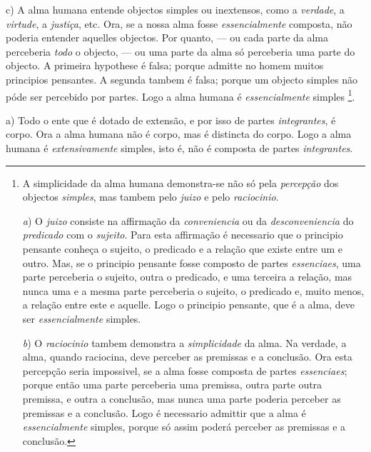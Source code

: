 c) A alma humana entende objectos simples ou inextensos, como a \emph{verdade}, a \emph{virtude}, a \emph{justiça}, etc. Ora, se a nossa alma fosse \emph{essencialmente} composta, não poderia entender aquelles objectos. Por quanto, --- ou cada parte da alma perceberia \emph{todo} o objecto, --- ou uma parte da alma só perceberia uma parte do objecto. A primeira hypothese é falsa; porque admitte no homem muitos principios pensantes. A segunda tambem é falsa; porque um objecto simples não póde ser percebido por partes. Logo a alma humana é \emph{essencialmente} simples \footnote{A simplicidade da alma humana demonstra-se não só pela \emph{percepção} dos objectos \emph{simples}, mas tambem pelo \emph{juizo} e pelo \emph{raciocinio}.\par \emph{a}) O \emph{juizo} consiste na affirmação da \emph{conveniencia} ou da \emph{desconveniencia} do \emph{predicado} com o \emph{sujeito}. Para esta affirmação é necessario que o principio pensante conheça o sujeito, o predicado e a relação que existe entre um e outro. Mas, se o principio pensante fosse composto de partes \emph{essenciaes}, uma parte perceberia o sujeito, outra o predicado, e uma terceira a relação, mas nunca uma e a mesma parte perceberia o sujeito, o predicado e, muito menos, a relação entre este e aquelle. Logo o principio pensante, que é a alma, deve ser \emph{essencialmente} simples.\par \emph{b}) O \emph{raciocinio} tambem demonstra a \emph{simplicidade} da alma. Na verdade, a alma, quando raciocina, deve perceber as premissas e a conclusão. Ora esta percepção seria impossivel, se a alma fosse composta de partes \emph{essenciaes}; porque então uma parte perceberia uma premissa, outra parte outra premissa, e outra a conclusão, mas nunca uma parte poderia perceber as premissas e a conclusão. Logo é necessario admittir que a alma é \emph{essencialmente} simples, porque só assim poderá perceber as premissas e a conclusão.}.


 

a) Todo o ente que é dotado de extensão, e por isso de   partes \emph{integrantes}, é corpo. Ora a alma humana não é corpo, mas é distincta do corpo. Logo a alma humana é \emph{extensivamente} simples, isto é, não é composta de partes \emph{integrantes}.

